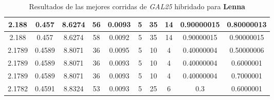 \begin{table}[h!]
\begin{center}
\begin{tabular}{|c|c|c|c|c|c|c|c|c|c|}
        \hline
        \hline
            2.188 & 0.457  & 8.6274 & 56 & 0.0093 & 5 & 35 & 14 & 0.90000015 & 0.80000013\\
        \hline
        \hline
            2.188 & 0.457  & 8.6274 & 58 & 0.0092 & 5 & 35 & 14 & 0.90000015 & 0.90000015\\
        \hline
        \hline
            2.1789 & 0.4589  & 8.8071 & 36 & 0.0095 & 5 & 10 & 4 & 0.40000004 & 0.50000006\\
        \hline
        \hline
            2.1789 & 0.4589  & 8.8071 & 36 & 0.0093 & 5 & 10 & 4 & 0.40000004 & 0.6000001\\
        \hline
        \hline
            2.1789 & 0.4589  & 8.8071 & 36 & 0.0093 & 5 & 10 & 4 & 0.40000004 & 0.7000001\\
        \hline
        \hline
            2.1782 & 0.4591  & 8.8324 & 53 & 0.0093 & 5 & 25 & 6 & 0.3 & 0.6000001\\
        \hline
        \end{tabular}
        \caption{Resultados de las mejores corridas de \emph{GAL25} hibridado para {\bf Lenna}}
        \label{tb:tableGAL25}
    \end{center}
\end{table}

